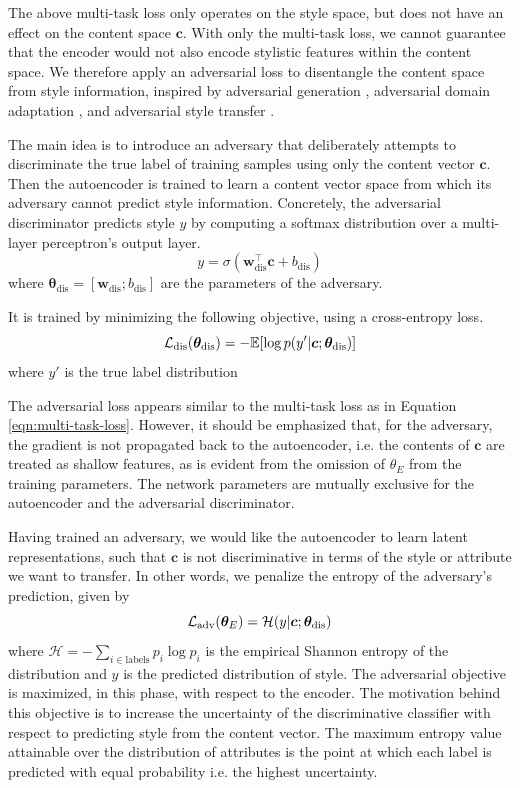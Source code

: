 The above multi-task loss only operates on the style space, but does not have an effect on the content space $\bm c$. With only the multi-task loss, we cannot guarantee that the encoder would not also encode stylistic features within the content space. We therefore apply an adversarial loss to disentangle the content space from style information, inspired by adversarial generation \citep{goodfellow2014generative}, adversarial domain adaptation \citep{liu2017adversarial}, and adversarial style transfer \citep{fu2017style}.

The main idea is to introduce an adversary that deliberately attempts to discriminate the true label of training samples using only the content vector $\bm c$. Then the autoencoder is trained to learn a content vector space from which its adversary cannot predict style information. Concretely, the adversarial discriminator predicts style $y$ by computing a softmax distribution over a multi-layer perceptron's output layer.
\begin{equation}
	y = \sigma(\bm w_\text{dis}^\top \bm c + b_\text{dis})
\end{equation}
where $\bm\theta_\text{dis}=[\bm w_\text{dis}; b_\text{dis}]$ are the parameters of the adversary.

It is trained by minimizing the following objective, using a cross-entropy loss.
\begin{equation} \label{eqn:adv-disc-loss}
	\mathcal{L}_\text{dis}(\bm\theta_\text{dis}) =
	- \mathbb{E} [\log p(y' | \bm c; \bm\theta_\text{dis})]
\end{equation}
where $y'$ is the true label distribution

The adversarial loss appears similar to the multi-task loss as in Equation \ref{eqn:multi-task-loss}. However, it should be emphasized that, for the adversary, the gradient is not propagated back to the autoencoder, i.e. the contents of $\bm c$ are treated as shallow features, as is evident from the omission of $\theta_{E}$ from the training parameters. The network parameters are mutually exclusive for the autoencoder and the adversarial discriminator.

Having trained an adversary, we would like the autoencoder to learn latent representations, such that $\bm c$ is not discriminative in terms of the style or attribute we want to transfer. In other words, we penalize the entropy of the adversary's prediction, given by
\begin{equation}
	\mathcal{L}_\text{adv}(\bm\theta_E) = \mathcal{H}(y | \bm c; \bm\theta_\text{dis})
\end{equation}
where $\mathcal{H}=-\sum_{i\in\text{labels}} p_i\log p_i$ is the empirical Shannon entropy of the distribution and $y$ is the predicted distribution of style. The adversarial objective is maximized, in this phase, with respect to the encoder. The motivation behind this objective is to increase the uncertainty of the discriminative classifier with respect to predicting style from the content vector. The maximum entropy value attainable over the distribution of attributes is the point at which each label is predicted with equal probability i.e. the highest uncertainty.


